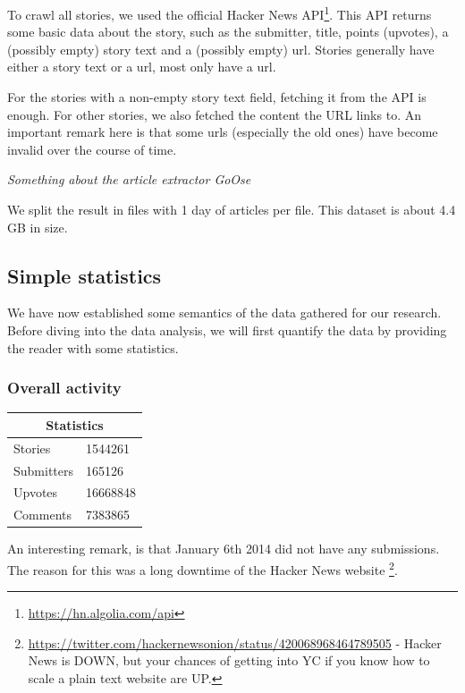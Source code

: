 To crawl all stories, we used the official Hacker News API\footnote{\url{https://hn.algolia.com/api}}. This API returns some basic data about the story, such as the submitter, title, points (upvotes), a (possibly empty) story text and a (possibly empty) url. Stories generally have either a story text or a url, most only have a url.

For the stories with a non-empty story text field, fetching it from the API is enough. For other stories, we also fetched the content the URL links to. An important remark here is that some urls (especially the old ones) have become invalid over the course of time.

\textit{Something about the article extractor GoOse}

We split the result in files with 1 day of articles per file. This dataset is about 4.4 GB in size.

\subsection{Simple statistics}
We have now established some semantics of the data gathered for our research. Before diving into the data analysis, we will first quantify the data by providing the reader with some statistics.

\subsubsection{Overall activity}

\begin{center}
    \begin{tabular}{|p{3cm}|p{3cm}|}
        \hline
        \multicolumn{2}{|c|}{Statistics} \\
        \hline
         Stories & 1544261 \\ 
         Submitters & 165126 \\ 
         Upvotes & 16668848 \\ 
         Comments & 7383865 \\
         \hline
    \end{tabular}
\end{center}

An interesting remark, is that January 6th 2014 did not have any submissions. The reason for this was a long downtime of the Hacker News website
\footnote{\url{https://twitter.com/hackernewsonion/status/420068968464789505} - Hacker News is DOWN, but your chances of getting into YC if you know how to scale a plain text website are UP.}.

